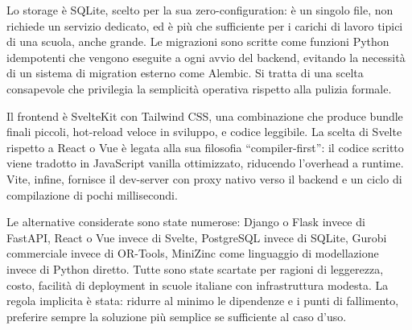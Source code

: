 Lo storage \`e SQLite, scelto per la sua zero-configuration:
\`e un singolo file, non richiede un servizio dedicato, ed \`e
pi\`u che sufficiente per i carichi di lavoro tipici di una
scuola, anche grande. Le migrazioni sono scritte come funzioni
Python idempotenti che vengono eseguite a ogni avvio del
backend, evitando la necessit\`a di un sistema di migration
esterno come Alembic. Si tratta di una scelta consapevole che
privilegia la semplicit\`a operativa rispetto alla pulizia
formale.

Il frontend \`e SvelteKit con Tailwind CSS, una combinazione
che produce bundle finali piccoli, hot-reload veloce in
sviluppo, e codice leggibile. La scelta di Svelte rispetto a
React o Vue \`e legata alla sua filosofia ``compiler-first'':
il codice scritto viene tradotto in JavaScript vanilla
ottimizzato, riducendo l'overhead a runtime. Vite, infine,
fornisce il dev-server con proxy nativo verso il backend e un
ciclo di compilazione di pochi millisecondi.

Le alternative considerate sono state numerose: Django o
Flask invece di FastAPI, React o Vue invece di Svelte,
PostgreSQL invece di SQLite, Gurobi commerciale invece di
OR-Tools, MiniZinc come linguaggio di modellazione invece di
Python diretto. Tutte sono state scartate per ragioni di
leggerezza, costo, facilit\`a di deployment in scuole italiane
con infrastruttura modesta. La regola implicita \`e stata:
ridurre al minimo le dipendenze e i punti di fallimento,
preferire sempre la soluzione pi\`u semplice se sufficiente al
caso d'uso.


